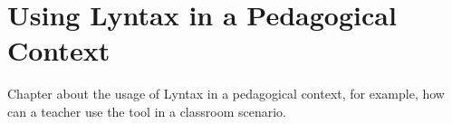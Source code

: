 \chapter{Using Lyntax in a Pedagogical Context} \label{pedagogical}
Chapter about the usage of Lyntax in a pedagogical context, for example, how can a teacher use the tool in a classroom scenario. 
